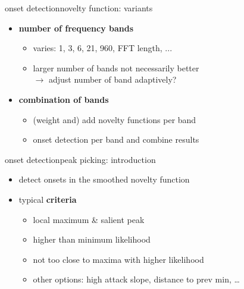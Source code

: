         \begin{frame}{onset detection}{novelty function: variants}
            \begin{itemize}
                \item	\textbf{number of frequency bands}
                    \begin{itemize}
                        \item	varies: 1, 3, 6, 21, 960, FFT length, ...
                        \item<2->	larger number of bands not necessarily better\\ $\rightarrow$ adjust number of band adaptively?
                    \end{itemize}
                \bigskip
                \item<3->	\textbf{combination of bands}
                    \begin{itemize}
                        \item	(weight and) add novelty functions per band
                        \item<4->	onset detection per band and combine results
                    \end{itemize}
            \end{itemize}
        \end{frame}
        \begin{frame}{onset detection}{peak picking: introduction}
            \vspace{-4mm}
            \begin{itemize}
                \item	detect onsets in the smoothed novelty function
                    \vspace{-5mm}
                
                \item<2->	typical \textbf{criteria}
                    \begin{itemize}
                        \item<2->	local maximum \& salient peak
                        \item<3->	higher than minimum likelihood
                        \item<4->	not too close to maxima with higher likelihood
                        \item<5->	other options: high attack slope, distance to prev min, \ldots
                    \end{itemize}
            \end{itemize}
        \end{frame}
